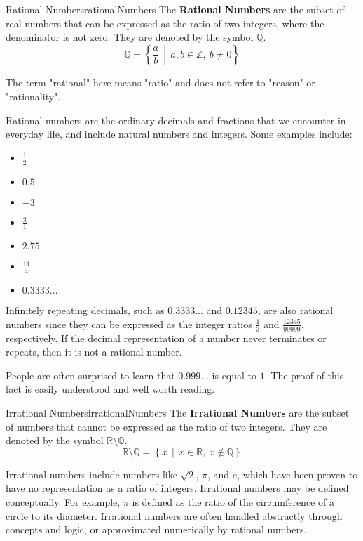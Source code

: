 \begin{definition}{Rational Numbers}{rationalNumbers}
  The \textbf{Rational Numbers} are the subset of real numbers that can be expressed as the
  ratio of two integers, where the denominator is not zero. They are denoted by
  the symbol \(\mathbb{Q}\).
  \[
    \mathbb{Q} = \left\{ \frac{a}{b} \,\middle|\, a, b \in \mathbb{Z},\ b \ne 0 \right\}
  \]

  The term "rational" here means "ratio" and does not refer to "reason" or "rationality".
\end{definition}

Rational numbers are the ordinary decimals and fractions that we encounter in everyday life, and include
natural numbers and integers. Some examples include:
\begin{itemize}
\item \(\frac{1}{2}\)
\item \(0.5\)
\item \(-3\)
\item \(\frac{3}{1}\)
\item \(2.75\)
\item \(\frac{11}{4}\)
\item \(0.3333\ldots\)
\end{itemize}

Infinitely repeating decimals, such as \(0.3333\ldots\) and \(0.\overline{12345}\), are also rational
numbers since they can be expressed as the integer ratios \(\frac{1}{3}\) and \(\frac{12345}{99999}\),
respectively. If the decimal representation of a number never terminates or repeats, then it is
not a rational number.

\begin{advancedTopic}
  People are often surprised to learn that \( 0.999\ldots \) is equal to \( 1 \). The proof of this
  fact is easily understood and well worth reading.
\end{advancedTopic}

\begin{definition}{Irrational Numbers}{irrationalNumbers}
  The \textbf{Irrational Numbers} are the subset of numbers that cannot be expressed
  as the ratio of two integers. They are denoted by the symbol \(\mathbb{R} \setminus \mathbb{Q}\).
  \[
    \mathbb{R} \setminus \mathbb{Q} = \left\{ x \,\middle|\, x \in \mathbb{R},\ x \notin \mathbb{Q} \right\}
  \]
\end{definition}

Irrational numbers include numbers like \(\sqrt{2}\), \(\pi\), and \( e \), which have been proven to
have no representation as a ratio of integers. Irrational numbers may be defined conceptually. For
example, \(\pi\) is defined as the ratio of the circumference of a circle to its diameter. Irrational
numbers are often handled abstractly through concepts and logic, or approximated numerically by rational numbers.

